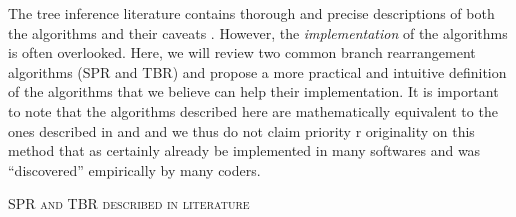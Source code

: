 \documentclass[12pt,letterpaper]{article}
\renewcommand{\section}[1]{%
\bigskip
\begin{center}
\begin{Large}
\normalfont\scshape #1
\medskip
\end{Large}
\end{center}}
\renewcommand{\subsection}[1]{%
\bigskip
\begin{center}
\begin{large}
\normalfont\itshape #1
\end{large}
\end{center}}
\begin{document}
The tree inference literature contains thorough and precise descriptions of both the algorithms \citep[e.g.][]{allen2001subtree,felsenstein2004inferring} and their caveats \citep[ie.e seepd and reliability - e.g.][]{morrison2007increasing,lakner2008efficiency,goloboff2014bias}.
However, the \textit{implementation} of the algorithms is often overlooked.
Here, we will review two common branch rearrangement algorithms (SPR and TBR) and propose a more practical and intuitive definition of the algorithms that we believe can help their implementation.
It is important to note that the algorithms described here are mathematically equivalent to the ones described in \cite{allen2001subtree} and \cite{felsenstein2004inferring} and we thus do not claim priority r originality on this method that as certainly already be implemented in many softwares and was ``discovered'' empirically by many coders.

\section{SPR and TBR described in literature}


\end{document}
